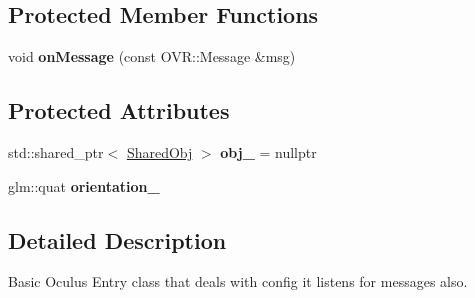\subsection*{Protected Member Functions}
\begin{DoxyCompactItemize}
\item 
\hypertarget{classs9_1_1oculus_1_1OculusBase_ae907d2afb62302ecc58b10736112400f}{void {\bfseries on\-Message} (const O\-V\-R\-::\-Message \&msg)}\label{classs9_1_1oculus_1_1OculusBase_ae907d2afb62302ecc58b10736112400f}

\end{DoxyCompactItemize}
\subsection*{Protected Attributes}
\begin{DoxyCompactItemize}
\item 
\hypertarget{classs9_1_1oculus_1_1OculusBase_aa86cf22b1cf3a3b7d79b02ba3bbe5a9b}{std\-::shared\-\_\-ptr$<$ \hyperlink{structs9_1_1oculus_1_1OculusBase_1_1SharedObj}{Shared\-Obj} $>$ {\bfseries obj\-\_\-} = nullptr}\label{classs9_1_1oculus_1_1OculusBase_aa86cf22b1cf3a3b7d79b02ba3bbe5a9b}

\item 
\hypertarget{classs9_1_1oculus_1_1OculusBase_a4777cb190dba8a41bc30b460355f269f}{glm\-::quat {\bfseries orientation\-\_\-}}\label{classs9_1_1oculus_1_1OculusBase_a4777cb190dba8a41bc30b460355f269f}

\end{DoxyCompactItemize}


\subsection{Detailed Description}
Basic Oculus Entry class that deals with config it listens for messages also. 


